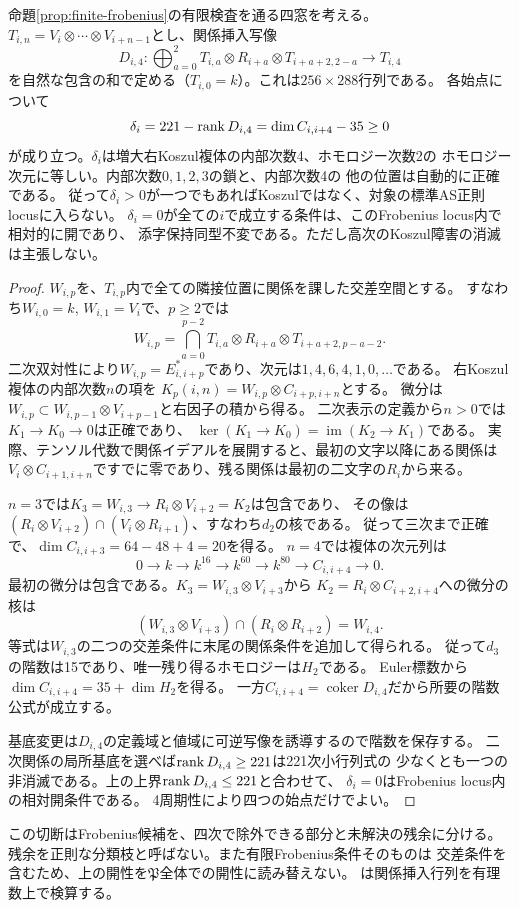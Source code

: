 \begin{proposition}[最初のKoszul障害と四次階数切断]\label{prop:quartic-koszul-obstruction}
命題\ref{prop:finite-frobenius}の有限検査を通る四窓を考える。
$T_{i,n}=V_i\otimes\cdots\otimes V_{i+n-1}$とし、関係挿入写像
\[
 D_{i,4}:\bigoplus_{a=0}^2
 T_{i,a}\otimes R_{i+a}\otimes T_{i+a+2,2-a}
 \longrightarrow T_{i,4}
\]
を自然な包含の和で定める（$T_{i,0}=k$）。これは$256\times288$行列である。
各始点について
\[
 \delta_i=221-\operatorname{rank} D_{i,4}
 =\dim C_{i,i+4}-35\geq0
\]
が成り立つ。$\delta_i$は増大右Koszul複体の内部次数4、ホモロジー次数2の
ホモロジー次元に等しい。内部次数$0,1,2,3$の鎖と、内部次数4の
他の位置は自動的に正確である。
従って$\delta_i>0$が一つでもあればKoszulではなく、対象の標準AS正則locusに入らない。
$\delta_i=0$が全ての$i$で成立する条件は、このFrobenius locus内で相対的に開であり、
添字保持同型不変である。ただし高次のKoszul障害の消滅は主張しない。
\end{proposition}
\begin{proof}
$W_{i,p}$を、$T_{i,p}$内で全ての隣接位置に関係を課した交差空間とする。
すなわち$W_{i,0}=k$, $W_{i,1}=V_i$で、$p\geq2$では
\[
 W_{i,p}=\bigcap_{a=0}^{p-2}
 T_{i,a}\otimes R_{i+a}\otimes T_{i+a+2,p-a-2}.
\]
二次双対性により$W_{i,p}=E_{i,i+p}^*$であり、次元は$1,4,6,4,1,0,\ldots$である。
右Koszul複体の内部次数$n$の項を
$K_p(i,n)=W_{i,p}\otimes C_{i+p,i+n}$とする。
微分は$W_{i,p}\subset W_{i,p-1}\otimes V_{i+p-1}$と右因子の積から得る。
二次表示の定義から$n>0$では$K_1\to K_0\to0$は正確であり、
$\ker(K_1\to K_0)=\operatorname{im}(K_2\to K_1)$である。
実際、テンソル代数で関係イデアルを展開すると、最初の文字以降にある関係は
$V_i\otimes C_{i+1,i+n}$ですでに零であり、残る関係は最初の二文字の$R_i$から来る。

$n=3$では$K_3=W_{i,3}\to R_i\otimes V_{i+2}=K_2$は包含であり、
その像は$(R_i\otimes V_{i+2})\cap(V_i\otimes R_{i+1})$、すなわち$d_2$の核である。
従って三次まで正確で、$\dim C_{i,i+3}=64-48+4=20$を得る。
$n=4$では複体の次元列は
\[
 0\longrightarrow k\longrightarrow k^{16}\longrightarrow k^{60}
 \longrightarrow k^{80}\longrightarrow C_{i,i+4}\longrightarrow0.
\]
最初の微分は包含である。$K_3=W_{i,3}\otimes V_{i+3}$から
$K_2=R_i\otimes C_{i+2,i+4}$への微分の核は
\[
 (W_{i,3}\otimes V_{i+3})\cap(R_i\otimes R_{i+2})=W_{i,4}.
\]
等式は$W_{i,3}$の二つの交差条件に末尾の関係条件を追加して得られる。
従って$d_3$の階数は15であり、唯一残り得るホモロジーは$H_2$である。
Euler標数から$\dim C_{i,i+4}=35+\dim H_2$を得る。
一方$C_{i,i+4}=\operatorname{coker}D_{i,4}$だから所要の階数公式が成立する。

基底変更は$D_{i,4}$の定義域と値域に可逆写像を誘導するので階数を保存する。
二次関係の局所基底を選べば$\operatorname{rank} D_{i,4}\geq221$は221次小行列式の
少なくとも一つの非消滅である。上の上界$\operatorname{rank} D_{i,4}\leq221$と合わせて、
$\delta_i=0$はFrobenius locus内の相対開条件である。
4周期性により四つの始点だけでよい。
\end{proof}
\begin{remark}
この切断はFrobenius候補を、四次で除外できる部分と未解決の残余に分ける。
残余を正則な分類枝と呼ばない。また有限Frobenius条件そのものは
交差条件を含むため、上の開性を$\mathfrak P$全体での開性に読み替えない。
は関係挿入行列を有理数上で検算する。
\end{remark}

